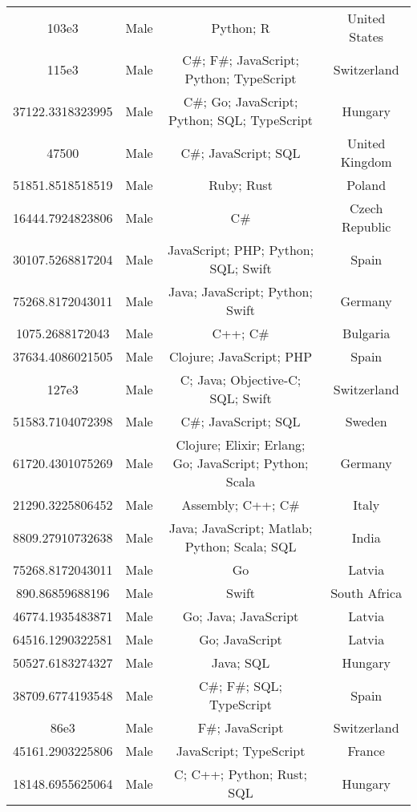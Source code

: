 \begin{center}
\begin{tabular}{ |c|c|c|c| }
103e3  &  Male  &  Python; R  &  United States  \\ 
115e3  &  Male  &  C\#; F\#; JavaScript; Python; TypeScript  &  Switzerland  \\ 
37122.3318323995  &  Male  &  C\#; Go; JavaScript; Python; SQL; TypeScript  &  Hungary  \\ 
47500  &  Male  &  C\#; JavaScript; SQL  &  United Kingdom  \\ 
51851.8518518519  &  Male  &  Ruby; Rust  &  Poland  \\ 
16444.7924823806  &  Male  &  C\#  &  Czech Republic  \\ 
30107.5268817204  &  Male  &  JavaScript; PHP; Python; SQL; Swift  &  Spain  \\ 
75268.8172043011  &  Male  &  Java; JavaScript; Python; Swift  &  Germany  \\ 
1075.2688172043  &  Male  &  C++; C\#  &  Bulgaria  \\ 
37634.4086021505  &  Male  &  Clojure; JavaScript; PHP  &  Spain  \\ 
127e3  &  Male  &  C; Java; Objective-C; SQL; Swift  &  Switzerland  \\ 
51583.7104072398  &  Male  &  C\#; JavaScript; SQL  &  Sweden  \\ 
61720.4301075269  &  Male  &  Clojure; Elixir; Erlang; Go; JavaScript; Python; Scala  &  Germany  \\ 
21290.3225806452  &  Male  &  Assembly; C++; C\#  &  Italy  \\ 
8809.27910732638  &  Male  &  Java; JavaScript; Matlab; Python; Scala; SQL  &  India  \\ 
75268.8172043011  &  Male  &  Go  &  Latvia  \\ 
890.86859688196  &  Male  &  Swift  &  South Africa  \\ 
46774.1935483871  &  Male  &  Go; Java; JavaScript  &  Latvia  \\ 
64516.1290322581  &  Male  &  Go; JavaScript  &  Latvia  \\ 
50527.6183274327  &  Male  &  Java; SQL  &  Hungary  \\ 
38709.6774193548  &  Male  &  C\#; F\#; SQL; TypeScript  &  Spain  \\ 
86e3  &  Male  &  F\#; JavaScript  &  Switzerland  \\ 
45161.2903225806  &  Male  &  JavaScript; TypeScript  &  France  \\ 
18148.6955625064  &  Male  &  C; C++; Python; Rust; SQL  &  Hungary  \\ 

\end{tabular}
\end{center}
